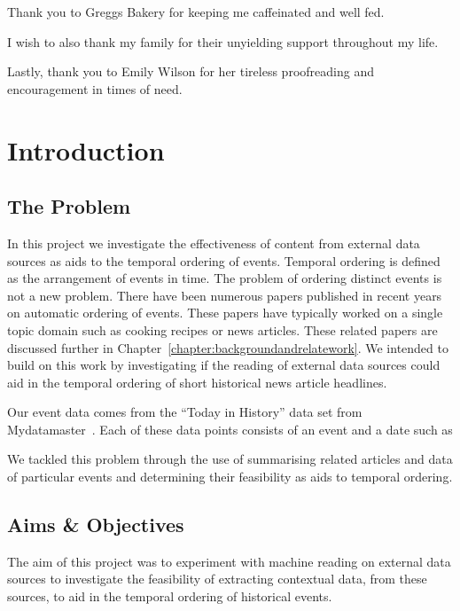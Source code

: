 \documentclass[bsc,frontabs,twoside,singlespacing,parskip,deptreport]{infthesis}     %
\begin{document}
Thank you to Greggs Bakery for keeping me caffeinated and well fed.

I wish to also thank my family for their unyielding support throughout my life. 

Lastly, thank you to Emily Wilson for her tireless proofreading and encouragement in times of need.

\tableofcontents



\chapter{Introduction}
\section{The Problem}
In this project we investigate the effectiveness of content from external data sources as aids to the temporal
ordering of events. Temporal ordering is defined as the arrangement of events in time.
The problem of ordering distinct events is not a new problem. There have been numerous papers published
in recent years on automatic ordering of events. These papers have typically worked on a single
topic domain such as cooking recipes or news articles. These related papers are discussed further in Chapter~\ref{chapter:backgroundandrelatework}.
We intended to build on this work by
investigating if the reading of external data sources could aid in the temporal ordering of short
historical news article headlines.

Our event data comes from the ``Today in History'' data set from Mydatamaster~\cite{mydatamaster}. Each of these data points consists
of an event and a date such as
\begin{equation}
  [ \text{``Alaska becomes 49th State''}, \text{``1959-01-01''} ]\nonumber
\end{equation}


We tackled this problem through the use of summarising related articles and data of particular
events and determining their feasibility as aids to temporal ordering. 

\section{Aims \& Objectives}
The aim of this project was to experiment with machine reading on external data sources to
investigate the feasibility of extracting contextual data, from these sources, to aid in the
temporal ordering of historical events.
\end{document}
